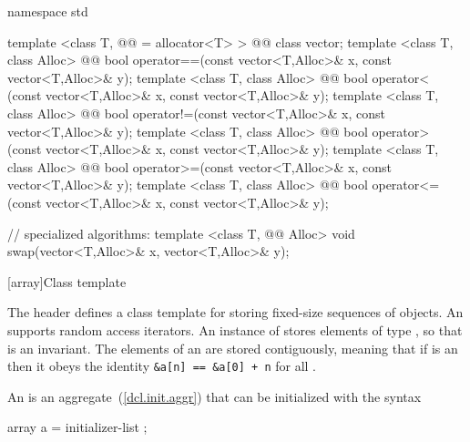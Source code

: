\documentclass[american,twoside]{book}
\begin{document}
%

\begin{codeblock}
namespace std {
  template <class T, @@ = allocator<T> > 
    @@ class vector;
  template <class T, class Alloc>
    @@
    bool operator==(const vector<T,Alloc>& x,
                    const vector<T,Alloc>& y);
  template <class T, class Alloc>
    @@
    bool operator< (const vector<T,Alloc>& x,
                    const vector<T,Alloc>& y);
  template <class T, class Alloc>
    @@
    bool operator!=(const vector<T,Alloc>& x,
                    const vector<T,Alloc>& y);
  template <class T, class Alloc>
    @@
    bool operator> (const vector<T,Alloc>& x,
                    const vector<T,Alloc>& y);
  template <class T, class Alloc>
    @@
    bool operator>=(const vector<T,Alloc>& x,
                    const vector<T,Alloc>& y);
  template <class T, class Alloc>
    @@
    bool operator<=(const vector<T,Alloc>& x,
                    const vector<T,Alloc>& y);

  // specialized algorithms:
  template <class T, @@ Alloc>
    void swap(vector<T,Alloc>& x, vector<T,Alloc>& y);
}
\end{codeblock}

[array]{\marktr{}Class template }
%

\pnum
{}%
The header  defines a class template for storing fixed-size
sequences of objects. An  supports random access iterators. An
instance of  stores  elements of type , so that 
 is an invariant. The elements of an  are stored contiguously,
meaning that if  is an  then it obeys the identity 
\verb|&a[n] == &a[0] + n| for all .

\pnum
{}%
%
An  is an aggregate~(\ref{dcl.init.aggr}) that can be
initialized with the syntax
\begin{codeblock}
array a = { initializer-list };
\end{codeblock}
\end{document}
